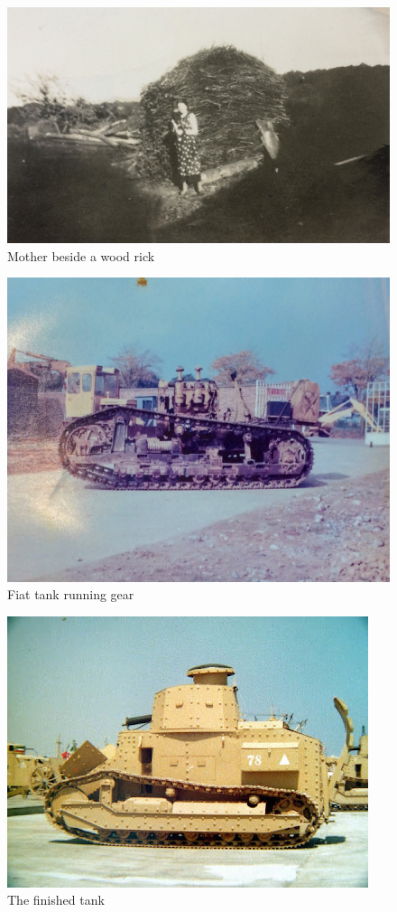 \begin{figure}
  \centering
  \includegraphics[width=.9\linewidth]{pictures/cropped/Mother beside a wood rick.jpg}
  \caption*{Mother beside a wood rick}
\end{figure}

\begin{figure}
  \centering
  \includegraphics[width=.8\linewidth]{pictures/cropped/Fiat tank running gear.jpg}
  \caption*{Fiat tank running gear}
\end{figure}

\begin{figure}
  \centering
  \includegraphics[width=.8\linewidth]{pictures/cropped/Finished tank.jpg}
  \caption*{The finished tank}
\end{figure}


